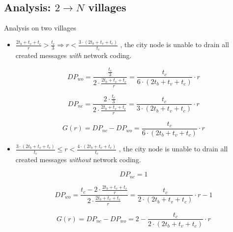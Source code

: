 \documentclass[compress]{beamer}
\newcommand\Fontvi{\fontsize{6}{7.2}\selectfont}
\begin{document}
\subsection{Analysis: $2 \rightarrow N$ villages}
\begin{frame}{Analysis on two villages}
	\Fontvi
	
	\begin{itemize}
		\item $\frac{2t_b + t_v + t_c}{r} > \frac{t_c}{3} 
		      \Rightarrow r < \frac{3 \cdot (2t_b + t_v + t_c)}{t_c}$
		      , the city node is unable to drain all created messages \emph{with} network coding.
		      
		      \begin{equation}
		      	DP_{wo} 
		      	= \frac{\frac{t_c}{3}}{2 \cdot \frac{2t_b + t_v + t_c}{r}}  
		      	= \frac{t_c}{6 \cdot (2t_b + t_v + t_c)} \cdot r
		      \end{equation}
		      
		      \begin{equation}
		      	DP_{nc} 
		      	= \frac{2 \cdot \frac{t_c}{3}}{2 \cdot \frac{2t_b + t_v + t_c}{r}} 
		      	= \frac{t_c}{3 \cdot (2t_b + t_v + t_c)}\cdot r
		      \end{equation}
		      
		      \begin{equation}
		      	G(r) = DP_{nc} - DP_{wo} =  \frac{t_c}{6 \cdot (2t_b + t_v + t_c)} \cdot r 
		      \end{equation}
		      
		\item $\frac{3 \cdot (2t_b + t_v + t_c)}{t_c} \le r < \frac{4 \cdot(2t_b + t_v + t_c)}{t_c}$
		      , the city node is unable to drain all created messages \emph{without} network coding.
		      
		      \begin{equation}
		      	DP_{nc} = 1
		      \end{equation}
		      
		      \begin{equation}
		      	DP_{wo} 
		      	= \frac{t_c - 2 \cdot \frac{2t_b + t_v + t_c}{r}}{2 \cdot \frac{2t_b + t_v + t_c}{r}}  
		      	= \frac{t_c}{2 \cdot (2t_b + t_v + t_c)} \cdot r - 1
		      \end{equation}
		      
		      \begin{equation}
		      	G(r) = DP_{nc} - DP_{wo} = 2 - \frac{t_c}{2 \cdot (2t_b + t_v + t_c)} \cdot r
		      \end{equation}
		      

\end{itemize}
\end{frame}
\end{document}
